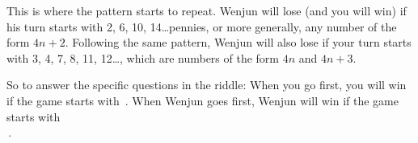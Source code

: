 \documentclass{article}
\begin{document}
This is where the pattern starts to repeat.
Wenjun will lose (and you will win) if his turn starts with 2, 6, 10, 14\dots pennies, or more generally, any number of the form $4n+2$.
Following the same pattern, Wenjun will also lose if your turn starts with 3, 4, 7, 8, 11, 12\dots, which are numbers of the form $4n$ and $4n+3$.

So to answer the specific questions in the riddle:
When you go first, you will win if the game starts with
\,.
When Wenjun goes first, Wenjun will win if the game starts with\\
\,.
\end{document}
